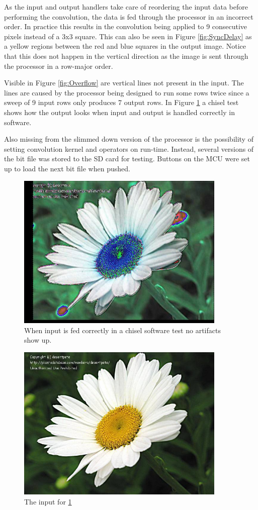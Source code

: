 As the input and output handlers take care of reordering the input data before performing the convolution, the data is fed through the processor in an incorrect order.
In practice this results in the convolution being applied to 9 consecutive pixels instead of a 3x3 square.
This can also be seen in Figure \ref{fig:SyncDelay} as a yellow regions between the red and blue squares in the output image.
Notice that this does not happen in the vertical direction as the image is sent through the processor in a row-major order.

Visible in Figure \ref{fig:Overflow} are vertical lines not present in the input.
The lines are caused by the processor being designed to run some rows twice since a sweep of 9 input rows only produces 7 output rows.
In Figure \ref{fig:soft_sim} a chisel test shows how the output looks when input and output is handled correctly in software.

Also missing from the slimmed down version of the processor is the possibility of setting convolution kernel and operators on run-time.
Instead, several versions of the bit file was stored to the SD card for testing.
Buttons on the MCU were set up to load the next bit file when pushed.

\begin{figure}
    \centering
    \includegraphics[width=10cm]{img/daisy1.jpg}
    \caption[Software simulated output]{When input is fed correctly in a chisel software test no artifacts show up.}
    \label{fig:soft_sim}
\end{figure}

\begin{figure}
    \centering
    \includegraphics[width=10cm]{img/daisyorig.jpg}
    \caption[Software simulation input]{The input for \ref{fig:soft_sim}}
    \label{fig:soft_sim_input}
\end{figure}

